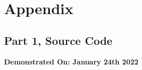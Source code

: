 
\section{Appendix}\label{sec:appendix}
\begin{appendix}

    \section{Part 1, Source Code}\label{sec:part1_source}
        \bigbreak
        {
            \selectfont\footnotesize
            
        }

        \textbf{Demonstrated On: January 24th 2022}

\end{appendix}